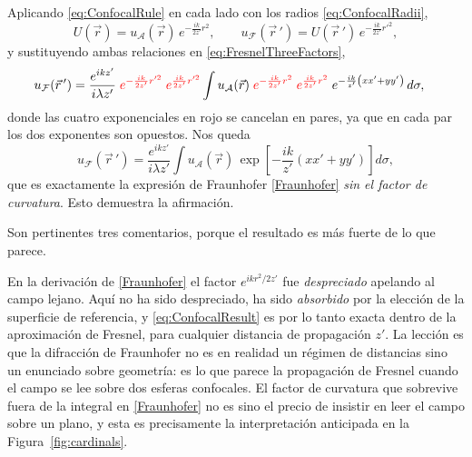 		Aplicando \eqref{eq:ConfocalRule} en cada lado con los radios \eqref{eq:ConfocalRadii},
		\begin{equation}\label{eq:ConfocalReferring}
			U(\vec{r}) = u_{\mathcal{A}}(\vec{r})\,e^{-\frac{ik}{2z'}r^{2}}, \qquad
			u_{\mathcal{F}}(\vec{r}\,') = U(\vec{r}\,')\,e^{-\frac{ik}{2z'}r'^{2}} ,
		\end{equation}
		y sustituyendo ambas relaciones en \eqref{eq:FresnelThreeFactors},
		\begin{align*}
			& u_{\mathcal{F}}(\vec{r}\,') = \dfrac{e^{ikz'}}{i\lambda z'}\;
			{\color{red}e^{-\frac{ik}{2z'}r'^{2}}}\;{\color{red}e^{\frac{ik}{2z'}r'^{2}}}
			\int u_{\mathcal{A}}(\vec{r})\;
			{\color{red}e^{-\frac{ik}{2z'}r^{2}}}\;{\color{red}e^{\frac{ik}{2z'}r^{2}}}\;
			e^{-\frac{ik}{z'}\left(xx'+yy'\right)}\,d\sigma ,
		\end{align*}
		donde las cuatro exponenciales en rojo se cancelan en pares, ya que en cada par los dos exponentes son opuestos. Nos queda
		\begin{equation}\label{eq:ConfocalResult}
			\boxed{\;u_{\mathcal{F}}(\vec{r}\,') = \dfrac{e^{ikz'}}{i\lambda z'}\int u_{\mathcal{A}}(\vec{r})\,
			\exp\left[-\dfrac{ik}{z'}\left(xx'+yy'\right)\right]d\sigma ,\;}
		\end{equation}
		que es exactamente la expresión de Fraunhofer \eqref{Fraunhofer} \textit{sin el factor de curvatura}. Esto demuestra la afirmación.

		Son pertinentes tres comentarios, porque el resultado es más fuerte de lo que parece.

		En la derivación de \eqref{Fraunhofer} el factor $e^{ikr^{2}/2z'}$ fue \textit{despreciado} apelando al campo lejano. Aquí no ha sido despreciado, ha sido \textit{absorbido} por la elección de la superficie de referencia, y \eqref{eq:ConfocalResult} es por lo tanto exacta dentro de la aproximación de Fresnel, para cualquier distancia de propagación $z'$. La lección es que la difracción de Fraunhofer no es en realidad un régimen de distancias sino un enunciado sobre geometría: es lo que parece la propagación de Fresnel cuando el campo se lee sobre dos esferas confocales. El factor de curvatura que sobrevive fuera de la integral en \eqref{Fraunhofer} no es sino el precio de insistir en leer el campo sobre un plano, y esta es precisamente la interpretación anticipada en la Figura~\ref{fig:cardinals}.

